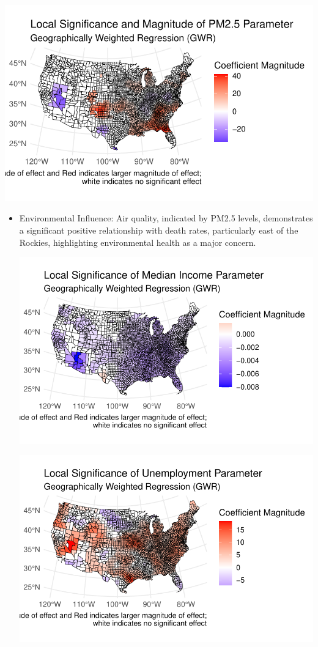 \documentclass[
]{article}
\begin{document}
\includegraphics{report_files/figure-pdf/unnamed-chunk-5-1.pdf}

\begin{itemize}
\item
  Environmental Influence: Air quality, indicated by PM2.5 levels,
  demonstrates a significant positive relationship with death rates,
  particularly east of the Rockies, highlighting environmental health as
  a major concern.

  \includegraphics{report_files/figure-pdf/unnamed-chunk-6-1.pdf}

  \includegraphics{report_files/figure-pdf/unnamed-chunk-6-2.pdf}
\end{itemize}
\end{document}
